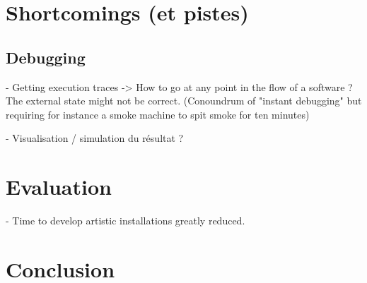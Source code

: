 \documentclass{sigchi}
\begin{document}
\section{Shortcomings (et pistes)}
\subsection{Debugging}
- Getting execution traces
-> How to go at any point in the flow of a software ? The external state might not be correct.
(Conoundrum of "instant debugging" but requiring for instance a smoke machine to spit smoke for ten minutes)

- Visualisation / simulation du résultat ? 

\section{Evaluation}
- Time to develop artistic installations greatly reduced.

\section{Conclusion}
\end{document}
